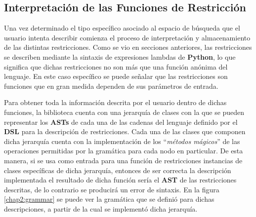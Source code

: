 \subsection{Interpretación de las Funciones de Restricción}

Una vez determinado el tipo específico asociado al espacio de búsqueda que el usuario intenta describir comienza
el proceso de interpretación y almacenamiento de las distintas restricciones. Como se vio en secciones
anteriores, las restricciones se describen mediante la sintaxis de expresiones lambdas de {\bf Python}, lo que
significa que dichas restricciones no son más que una función anónima del lenguaje. En este caso específico
se puede señalar que las restricciones son funciones que en gran medida dependen de sus parámetros de entrada.

Para obtener toda la información descrita por el usuario dentro de dichas funciones, la biblioteca cuenta con
una jerarquía de clases con la que se pueden representar los {\bf ASTs} de cada una de las cadenas del lenguaje definido
por el {\bf DSL} para la descripción de restricciones. Cada una de las clases que componen dicha jerarquía cuenta con
la implementación de los ``{\it métodos mágicos}'' de las operaciones permitidas por la gramática para cada nodo en particular. De esta manera,
si se usa como entrada para una función de restricciones instancias de clases específicas de dicha jerarquía,
entonces de ser correcta la descripción implementada el resultado de dicha función sería el {\bf AST} de las restricciones
descritas, de lo contrario se producirá un error de sintaxis. En la figura \ref{chap2:grammar} se puede ver la gramática que se 
definió para dichas descripciones, a partir de la cual se implementó dicha jerarquía.



